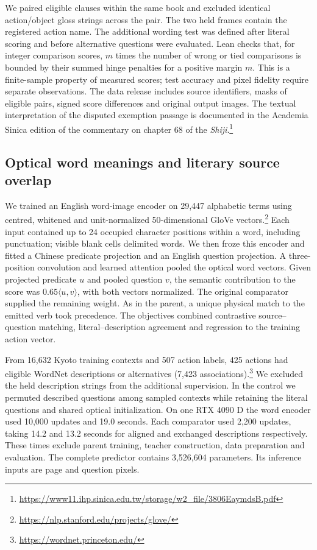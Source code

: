 \documentclass[12pt,a4paper]{article}
\providecommand{\DIFadd}[1]{{\protect\color{blue} \sf #1}} %
\begin{document}
\DIFadd{We paired eligible clauses within the same book and excluded identical action/object gloss strings across the pair. The two held frames contain the registered action name. The additional wording test was defined after literal scoring and before alternative questions were evaluated. Lean checks that, for integer comparison scores, $m$ times the number of wrong or tied comparisons is bounded by their summed hinge penalties for a positive margin $m$. This is a finite-sample property of measured scores; test accuracy and pixel fidelity require separate observations. The data release includes source identifiers, masks of eligible pairs, signed score differences and original output images. The textual interpretation of the disputed exemption passage is documented in the Academia Sinica edition of the commentary on chapter 68 of the \textit{Shiji}.}\footnote{\url{https://www11.ihp.sinica.edu.tw/storage/w2_file/3806EaymdsB.pdf}}

\subsection*{\DIFadd{Optical word meanings and literary source overlap}}
\DIFadd{We trained an English word-image encoder on 29,447 alphabetic terms using centred, whitened and unit-normalized 50-dimensional GloVe vectors.}\footnote{\url{https://nlp.stanford.edu/projects/glove/}} \DIFadd{Each input contained up to 24 occupied character positions within a word, including punctuation; visible blank cells delimited words. We then froze this encoder and fitted a Chinese predicate projection and an English question projection. A three-position convolution and learned attention pooled the optical word vectors. Given projected predicate $u$ and pooled question $v$, the semantic contribution to the score was $0.65\langle u,v\rangle$, with both vectors normalized. The original comparator supplied the remaining weight. As in the parent, a unique physical match to the emitted verb took precedence. The objectives combined contrastive source--question matching, literal--description agreement and regression to the training action vector.
}

\DIFadd{From 16,632 Kyoto training contexts and 507 action labels, 425 actions had eligible WordNet descriptions or alternatives (7,423 associations).}\footnote{\url{https://wordnet.princeton.edu/}} \DIFadd{We excluded the held description strings from the additional supervision. In the control we permuted described questions among sampled contexts while retaining the literal questions and shared optical initialization. On one RTX 4090 D the word encoder used 10,000 updates and 19.0 seconds. Each comparator used 2,200 updates, taking 14.2 and 13.2 seconds for aligned and exchanged descriptions respectively. These times exclude parent training, teacher construction, data preparation and evaluation. The complete predictor contains 3,526,604 parameters. Its inference inputs are page and question pixels.
}
\end{document}

